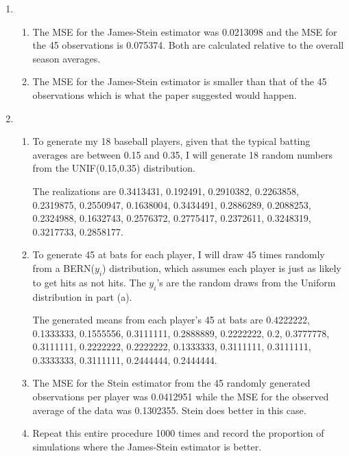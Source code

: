 \documentclass{article}\usepackage[]{graphicx}\usepackage[]{color}
\begin{document}
\begin{enumerate}
\item%

\begin{enumerate}
\item%


The MSE for the James-Stein estimator was 0.0213098 and the MSE for the 45 observations is 0.075374. Both are calculated relative to the overall season averages.

\item%

The MSE for the James-Stein estimator is smaller than that of the 45 observations which is what the paper suggested would happen.

\end{enumerate}

\item%
\begin{enumerate}
\item%
To generate my 18 baseball players, given that the typical batting averages are between 0.15 and 0.35, I will generate 18 random numbers from the UNIF(0.15,0.35) distribution.



The realizations are 0.3413431, 0.192491, 0.2910382, 0.2263858, 0.2319875, 0.2550947, 0.1638004, 0.3434491, 0.2886289, 0.2088253, 0.2324988, 0.1632743, 0.2576372, 0.2775417, 0.2372611, 0.3248319, 0.3217733, 0.2858177.

\item%
To generate 45 at bats for each player, I will draw 45 times randomly from a BERN($y_{i}$) distribution, which assumes each player is just as likely to get hits as not hits. The $y_{i}$'s are the random draws from the Uniform distribution in part (a).



The generated means from each player's 45 at bats are 0.4222222, 0.1333333, 0.1555556, 0.3111111, 0.2888889, 0.2222222, 0.2, 0.3777778, 0.3111111, 0.2222222, 0.2222222, 0.1333333, 0.3111111, 0.3111111, 0.3333333, 0.3111111, 0.2444444, 0.2444444.

\item%



The MSE for the Stein estimator from the 45 randomly generated observations per player was 0.0412951 while the MSE for the observed average of the data was 0.1302355. Stein does better in this case.

\item%
Repeat this entire procedure 1000 times and record the proportion of simulations where the James-Stein estimator is better.




\end{enumerate}
\end{enumerate}
\end{document}
